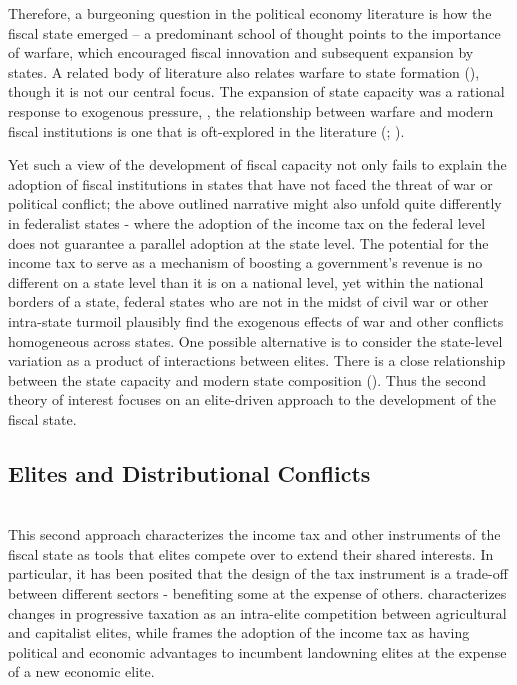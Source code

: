 \documentclass[letter, 12pt]{article}
\begin{document}
Therefore, a burgeoning question in the political economy literature is how the fiscal state emerged – a predominant school of thought points to the importance of warfare, which encouraged fiscal innovation and subsequent expansion by states. A related body of literature also relates warfare to state formation (\citealt{tilly1992coercion}), though it is not our central focus. The expansion of state capacity was a rational response to exogenous pressure, \cite{scheve2010conscription}, the relationship between warfare and modern fiscal institutions is one that is oft-explored in the literature (\citealt{dincecco2012warfare}; \citealt{besley2009origins}).

Yet such a view of the development of fiscal capacity not only fails to explain the adoption of fiscal institutions in states that have not faced the threat of war or political conflict; the above outlined narrative might also unfold quite differently in federalist states - where the adoption of the income tax on the federal level does not guarantee a parallel adoption at the state level. The potential for the income tax to serve as a mechanism of boosting a government's revenue is no different on a state level than it is on a national level, yet within the national borders of a state, federal states who are not in the midst of civil war or other intra-state turmoil plausibly find the exogenous effects of war and other conflicts homogeneous across states. One possible alternative is to consider the state-level variation as a product of interactions between elites. There is a close relationship between the state capacity and modern state composition (\citealt{lieberman2002taxation}). Thus the second theory of interest focuses on an elite-driven approach to the development of the fiscal state. 

\subsection{Elites and Distributional Conflicts}\hfill\\

This second approach characterizes the income tax and other instruments of the fiscal state as tools that elites compete over to extend their shared interests. In particular, it has been posited that the design of the tax instrument is a trade-off between different sectors - benefiting some at the expense of others. \cite{beramendi2018intra} characterizes changes in progressive taxation as an intra-elite competition between agricultural and capitalist elites, while \cite{mares2015non} frames the adoption of the income tax as having political and economic advantages to incumbent landowning elites at the expense of a new economic elite. 
\end{document}
